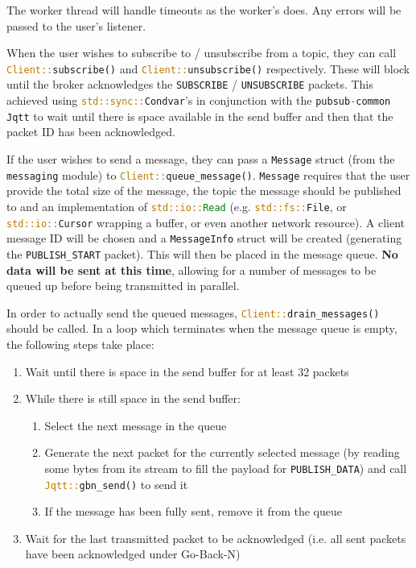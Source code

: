 \documentclass[a4paper]{article}
\numberwithin{figure}{section}
\numberwithin{table}{section}
\newcommand{\mi}{\mintinline}
\begin{document}
The worker thread will handle timeouts as the worker's does. Any errors will be passed to the user's listener.

When the user wishes to subscribe to / unsubscribe from a topic, they can call \mi{rust}{Client::subscribe()} and \mi{rust}{Client::unsubscribe()} respectively. These will block until the broker acknowledges the \mi{c}{SUBSCRIBE} / \mi{c}{UNSUBSCRIBE} packets. This achieved using \mi{rust}{std::sync::Condvar}'s in conjunction with the \mi{c}{pubsub-common} \mi{rust}{Jqtt} to wait until there is space available in the send buffer and then that the packet ID has been acknowledged.

\medskip
\noindent If the user wishes to send a message, they can pass a \mi{rust}{Message} struct (from the \mi{c}{messaging} module) to \mi{rust}{Client::queue_message()}. \mi{rust}{Message} requires that the user provide the total size of the message, the topic the message should be published to and an implementation of \mi{rust}{std::io::Read} (e.g. \mi{rust}{std::fs::File}, or \mi{rust}{std::io::Cursor} wrapping a buffer, or even another network resource). A client message ID will be chosen and a \mi{rust}{MessageInfo} struct will be created (generating the \mi{c}{PUBLISH_START} packet). This will then be placed in the message queue. \textbf{No data will be sent at this time}, allowing for a number of messages to be queued up before being transmitted in parallel.

In order to actually send the queued messages, \mi{rust}{Client::drain_messages()} should be called. In a loop which terminates when the message queue is empty, the following steps take place:
\begin{enumerate}
	\item Wait until there is space in the send buffer for at least 32 packets
	\item While there is still space in the send buffer:
		\begin{enumerate}
			\item Select the next message in the queue
			\item Generate the next packet for the currently selected message (by reading some bytes from its stream to fill the payload for \mi{rust}{PUBLISH_DATA}) and call \mi{rust}{Jqtt::gbn_send()} to send it
			\item If the message has been fully sent, remove it from the queue
		\end{enumerate}
	\item Wait for the last transmitted packet to be acknowledged (i.e. all sent packets have been acknowledged under Go-Back-N)
\end{enumerate}
\end{document}
